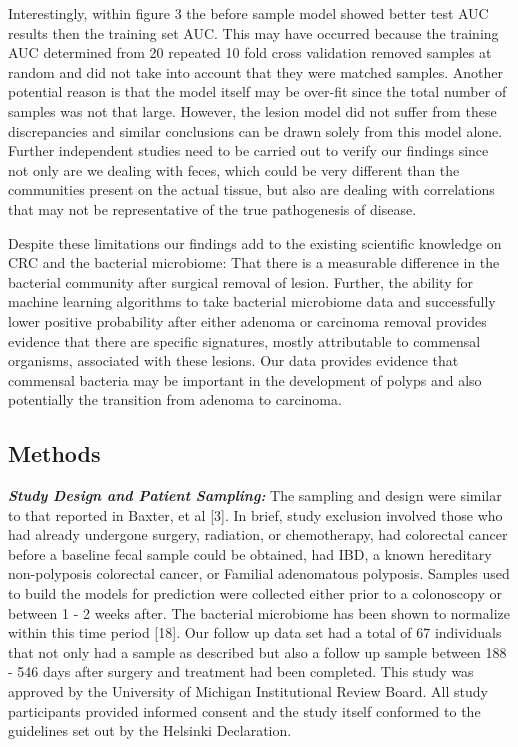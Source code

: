 \documentclass[12pt,]{article}
\begin{document}
Interestingly, within figure 3 the before sample model showed better
test AUC results then the training set AUC. This may have occurred
because the training AUC determined from 20 repeated 10 fold cross
validation removed samples at random and did not take into account that
they were matched samples. Another potential reason is that the model
itself may be over-fit since the total number of samples was not that
large. However, the lesion model did not suffer from these discrepancies
and similar conclusions can be drawn solely from this model alone.
Further independent studies need to be carried out to verify our
findings since not only are we dealing with feces, which could be very
different than the communities present on the actual tissue, but also
are dealing with correlations that may not be representative of the true
pathogenesis of disease.

Despite these limitations our findings add to the existing scientific
knowledge on CRC and the bacterial microbiome: That there is a
measurable difference in the bacterial community after surgical removal
of lesion. Further, the ability for machine learning algorithms to take
bacterial microbiome data and successfully lower positive probability
after either adenoma or carcinoma removal provides evidence that there
are specific signatures, mostly attributable to commensal organisms,
associated with these lesions. Our data provides evidence that commensal
bacteria may be important in the development of polyps and also
potentially the transition from adenoma to carcinoma.

\newpage

\subsection{Methods}\label{methods}

\textbf{\emph{Study Design and Patient Sampling:}} The sampling and
design were similar to that reported in Baxter, et al {[}3{]}. In brief,
study exclusion involved those who had already undergone surgery,
radiation, or chemotherapy, had colorectal cancer before a baseline
fecal sample could be obtained, had IBD, a known hereditary
non-polyposis colorectal cancer, or Familial adenomatous polyposis.
Samples used to build the models for prediction were collected either
prior to a colonoscopy or between 1 - 2 weeks after. The bacterial
microbiome has been shown to normalize within this time period {[}18{]}.
Our follow up data set had a total of 67 individuals that not only had a
sample as described but also a follow up sample between 188 - 546 days
after surgery and treatment had been completed. This study was approved
by the University of Michigan Institutional Review Board. All study
participants provided informed consent and the study itself conformed to
the guidelines set out by the Helsinki Declaration.
\end{document}
